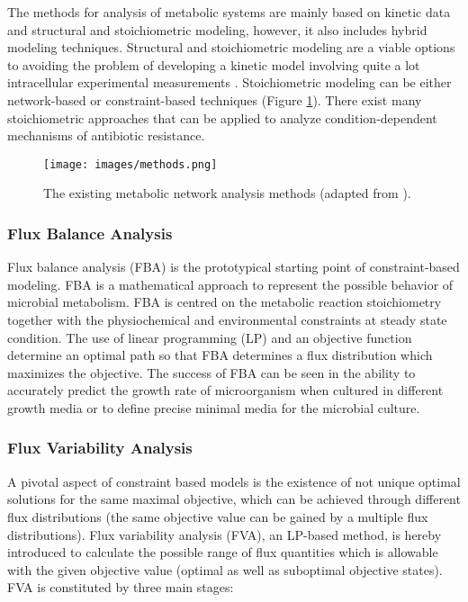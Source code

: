 \documentclass{article}
\begin{document}
The methods for analysis of metabolic systems are mainly based on kinetic data and structural and stoichiometric modeling, however, it also includes hybrid modeling techniques. Structural and stoichiometric modeling are a viable options to avoiding the problem of developing a kinetic model involving quite a lot intracellular experimental measurements \cite{Tomar}. Stoichiometric modeling can be either network-based or constraint-based techniques (Figure \ref{fig:methods}). There exist many stoichiometric approaches that can be applied to analyze condition-dependent mechanisms of antibiotic resistance.

\begin{figure}
\centering
\texttt{[image: images/methods.png]}
\caption{\label{fig:methods} The existing metabolic network analysis methods (adapted from \cite{Tomar}).}
\end{figure}

\subsubsection{Flux Balance Analysis}

Flux balance analysis (FBA) is the prototypical starting point of constraint-based modeling. FBA is a mathematical approach to represent the possible behavior of microbial metabolism. FBA is centred on the metabolic reaction stoichiometry together with the physiochemical and environmental constraints at steady state condition. The use of linear programming (LP) and an objective function determine an optimal path so that FBA determines a flux distribution which maximizes the objective. The success of FBA can be seen in the ability to accurately predict the growth rate of microorganism when cultured in different growth media or to define precise minimal media for the microbial culture.

\subsubsection{Flux Variability Analysis}

A pivotal aspect of constraint based models is the existence of not unique optimal solutions for the same maximal objective, which can be achieved through different flux distributions (the same objective value can be gained by a multiple flux distributions). Flux variability analysis (FVA), an LP-based method, is hereby introduced to calculate the possible range of flux quantities which is allowable with the given objective value (optimal as well as suboptimal objective states). FVA is constituted by three main stages:
\end{document}
